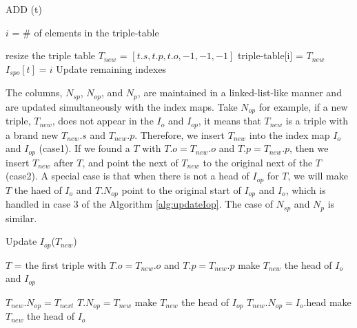 \documentclass{article}
\begin{document}
\begin{enumerate}
\begin{enumerate}
\begin{algorithm}[H]
\caption{ADD (t)}\label{alg:cap}
\begin{algorithmic}

 
\State \Return
\EndIf

\State $i$ = \# of elements in the triple-table

\State resize the triple table
\EndIf
\State $T_{new}$ = $[t.s, t.p, t.o, -1, -1, -1]$ 
\State triple-table[i] = $T_{new}$
\State $I_{spo}[t] = i$
\State Update remaining indexes
\end{algorithmic}
\end{algorithm}

The columns, $N_{sp}$, $N_{op}$, and $N_p$, are maintained in a linked-list-like manner and are updated simultaneously with the index maps. Take $N_{op}$ for example, if a new triple, $T_{new}$, does not appear in the $I_o$ and $I_{op}$, it means that  $T_{new}$ is a triple with a brand new $T_{new}.s$ and $T_{new}.p$. Therefore, we insert $T_{new}$ into the index map $I_o$ and $I_{op}$ (case1). If we found a $T$ with $T.o = T_{new}.o$ and $T.p = T_{new}.p$, then we insert $T_{new}$ after $T$, and point the next of $T_{new}$ to the original next of the $T$ (case2). A special case is that when there is not a head of $I_{op}$ for $T$, we will make $T$ the haed of $I_{o}$ and $T.N_{op}$ point to the original start of $I_{op}$ and $I_o$, which  is handled in case 3 of the Algorithm \eqref{alg:updateIop}. The case of $N_{sp}$ and $N_p$ is similar.

\begin{algorithm}[H]
\caption{Update $I_{op}$($T_{new}$)}\label{alg:updateIop}
\begin{algorithmic}
\State $T$ = the first triple with $T.o = T_{new}.o$ and $T.p = T_{new}.p$
\State make $T_{new}$ the head of $I_o$ and $I_{op}$ 
\EndIf

\State $T_{new}.N_{op} = T_{next}$
\State $T.N_{op} = T_{new}$
 
\State make $T_{new}$ the head of $I_{op}$ 
\State $T_{new}.N_{op} = I_o$.head
\State make $T_{new}$ the head of $I_{o}$ 
\EndIf

\end{algorithmic}
\end{algorithm}


\end{enumerate}
\end{enumerate}
\end{document}
